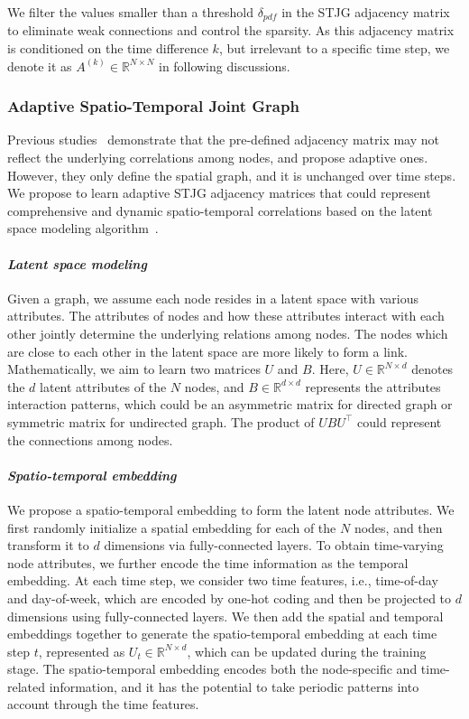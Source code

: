 \documentclass[10pt,journal,compsoc]{IEEEtran}
\begin{document}
We filter the values smaller than a threshold $ \delta_{pdf} $ in the STJG adjacency matrix to eliminate weak connections and control the sparsity. As this adjacency matrix is conditioned on the time difference $ k $, but irrelevant to a specific time step, we denote it as $ A^{(k)} \in \mathbb{R}^{N \times N} $ in following discussions. 

\subsubsection{Adaptive Spatio-Temporal Joint Graph}

Previous studies~\cite{Wu-et-al:IJCAI2019,Bai-et-al:NIPS2020} demonstrate that the pre-defined adjacency matrix may not reflect the underlying correlations among nodes, and propose adaptive ones. However, they only define the spatial graph, and it is unchanged over time steps. We propose to learn adaptive STJG adjacency matrices that could represent comprehensive and dynamic spatio-temporal correlations based on the latent space modeling algorithm~\cite{Deng-et-al:KDD2016}.

\paragraph{\textit{Latent space modeling}} Given a graph, we assume each node resides in a latent space with various attributes. The attributes of nodes and how these attributes interact with each other jointly determine the underlying relations among nodes. The nodes which are close to each other in the latent space are more likely to form a link. Mathematically, we aim to learn two matrices $ U $ and $ B $. Here, $ U \in \mathbb{R}^{N \times d} $ denotes the $ d $ latent attributes of the $ N $ nodes, and $ B \in \mathbb{R}^{d \times d} $ represents the attributes interaction patterns, which could be an asymmetric matrix for directed graph or symmetric matrix for undirected graph. The product of $ UBU^\top $ could represent the connections among nodes. 

\paragraph{\textit{Spatio-temporal embedding}} We propose a spatio-temporal embedding to form the latent node attributes. We first randomly initialize a spatial embedding for each of the $ N $ nodes, and then transform it to $ d $ dimensions via fully-connected layers. To obtain time-varying node attributes, we further encode the time information as the temporal embedding. At each time step, we consider two time features, i.e., time-of-day and day-of-week, which are encoded by one-hot coding and then be projected to $ d $ dimensions using fully-connected layers. We then add the spatial and temporal embeddings together to generate the spatio-temporal embedding at each time step $ t $, represented as $ U_t \in \mathbb{R}^{N \times d} $, which can be updated during the training stage. The spatio-temporal embedding encodes both the node-specific and time-related information, and it has the potential to take periodic patterns into account through the time features.  
\end{document}
